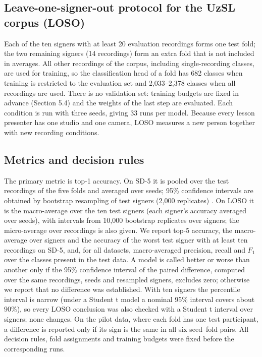 \documentclass[a4paper,fleqn]{cas-dc}
\begin{document}
\hypertarget{leave-one-signer-out-protocol-for-the-uzsl-corpus-loso}{%
\subsection{Leave-one-signer-out protocol for the UzSL corpus (LOSO)}\label{leave-one-signer-out-protocol-for-the-uzsl-corpus-loso}}

Each of the ten signers with at least 20 evaluation recordings forms one test fold; the two remaining signers (14 recordings) form an extra fold that is not included in averages. All other recordings of the corpus, including single-recording classes, are used for training, so the classification head of a fold has 682 classes when training is restricted to the evaluation set and 2,033--2,378 classes when all recordings are used. There is no validation set: training budgets are fixed in advance (Section 5.4) and the weights of the last step are evaluated. Each condition is run with three seeds, giving 33 runs per model. Because every lesson presenter has one studio and one camera, LOSO measures a new person together with new recording conditions.

\hypertarget{metrics-and-decision-rules}{%
\subsection{Metrics and decision rules}\label{metrics-and-decision-rules}}

The primary metric is top-1 accuracy. On SD-5 it is pooled over the test recordings of the five folds and averaged over seeds; 95\% confidence intervals are obtained by bootstrap resampling of test signers (2,000 replicates) \cite{2016_efron_hastie_casi}. On LOSO it is the macro-average over the ten test signers (each signer's accuracy averaged over seeds), with intervals from 10,000 bootstrap replicates over signers; the micro-average over recordings is also given. We report top-5 accuracy, the macro-average over signers and the accuracy of the worst test signer with at least ten recordings on SD-5, and, for all datasets, macro-averaged precision, recall and \(F_1\) over the classes present in the test data. A model is called better or worse than another only if the 95\% confidence interval of the paired difference, computed over the same recordings, seeds and resampled signers, excludes zero; otherwise we report that no difference was established. With ten signers the percentile interval is narrow (under a Student t model a nominal 95\% interval covers about 90\%), so every LOSO conclusion was also checked with a Student t interval over signers; none changes. On the pilot data, where each fold has one test participant, a difference is reported only if its sign is the same in all six seed--fold pairs. All decision rules, fold assignments and training budgets were fixed before the corresponding runs.
\end{document}
